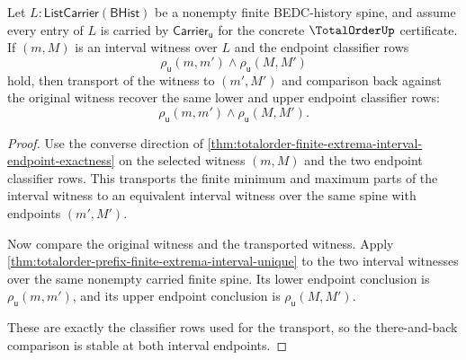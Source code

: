 \begin{theorem}
\label{thm:totalorder-finite-extrema-interval-roundtrip-stability}
Let $L:\mathsf{ListCarrier}(\mathsf{BHist})$ be a nonempty finite BEDC-history
spine, and assume every entry of $L$ is carried by
$\mathsf{Carrier}_{\mathsf{u}}$ for the concrete $\TotalOrderUp$ certificate. If
$(m,M)$ is an interval witness over $L$ and the endpoint classifier rows
$$
\rho_{\mathsf{u}}(m,m')
\land
\rho_{\mathsf{u}}(M,M')
$$
hold, then transport of the witness to $(m',M')$ and comparison back against the
original witness recover the same lower and upper endpoint classifier rows:
$$
\rho_{\mathsf{u}}(m,m')
\land
\rho_{\mathsf{u}}(M,M').
$$
\end{theorem}
\begin{proof}
Use the converse direction of
\autoref{thm:totalorder-finite-extrema-interval-endpoint-exactness} on the
selected witness $(m,M)$ and the two endpoint classifier rows. This transports
the finite minimum and maximum parts of the interval witness to an equivalent
interval witness over the same spine with endpoints $(m',M')$.

Now compare the original witness and the transported witness. Apply
\autoref{thm:totalorder-prefix-finite-extrema-interval-unique} to the two
interval witnesses over the same nonempty carried finite spine. Its lower
endpoint conclusion is $\rho_{\mathsf{u}}(m,m')$, and its upper endpoint
conclusion is $\rho_{\mathsf{u}}(M,M')$.

These are exactly the classifier rows used for the transport, so the
there-and-back comparison is stable at both interval endpoints.
\end{proof}

